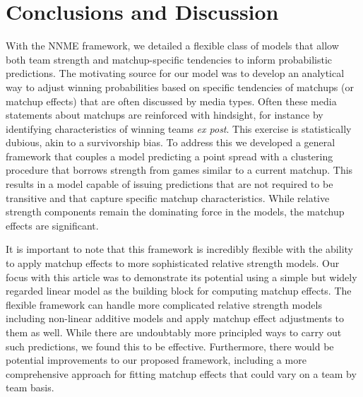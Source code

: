 \documentclass[letterpaper,12pt]{article}
\begin{document}
\section{Conclusions and Discussion}
With the NNME framework, we detailed a flexible class of models that allow both team strength and matchup-specific tendencies to inform probabilistic predictions. The motivating source for our model was to develop an analytical way to adjust winning probabilities based on specific tendencies of matchups (or matchup effects) that are often discussed by media types. Often these media statements about matchups are reinforced with hindsight, for instance by identifying characteristics of winning teams \emph{ex post}. This exercise is statistically dubious, akin to a survivorship bias. To address this we developed a general framework that couples a model predicting a point spread with a clustering procedure that borrows strength from games similar to a current matchup. This results in a model capable of issuing predictions that are not required to be transitive and that capture specific matchup characteristics. While relative strength components remain the dominating force in the models, the matchup effects are significant. 

It is important to note that this framework is incredibly flexible with the ability to apply matchup effects to more sophisticated relative strength models. Our focus with this article was to demonstrate its potential using a simple but widely regarded linear model as the building block for computing matchup effects. The flexible framework can handle more complicated relative strength models including non-linear additive models and apply matchup effect adjustments to them as well. While there are undoubtably more principled ways to carry out such predictions, we found this to be effective. Furthermore, there would be potential improvements to our proposed framework, including a more comprehensive approach for fitting matchup effects that could vary on a team by team basis.


\end{document}
